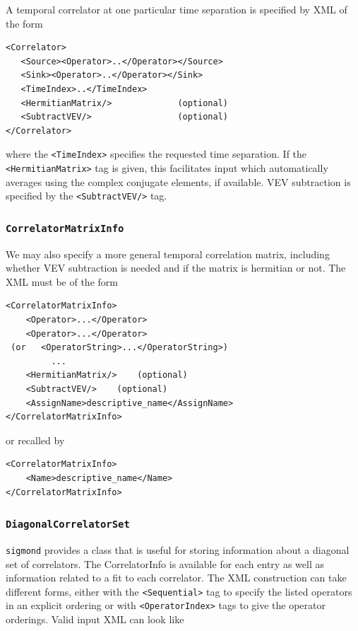 \documentclass[12pt]{article}
\newcommand{\sigmond}{\texttt{sigmond} }
\newcommand{\vb}{\texttt}
\begin{document}
A temporal correlator at one particular time separation is specified
by XML of the form
\begin{verbatim}
<Correlator>
   <Source><Operator>..</Operator></Source>
   <Sink><Operator>..</Operator></Sink>
   <TimeIndex>..</TimeIndex>
   <HermitianMatrix/>             (optional)
   <SubtractVEV/>                 (optional)
</Correlator>
\end{verbatim}
where the \vb{<TimeIndex>} specifies the requested time separation.
If the \vb{<HermitianMatrix>} tag is given, this facilitates
input which automatically averages using the complex conjugate
elements, if available.  VEV subtraction is specified by the
\vb{<SubtractVEV/>} tag.

\subsubsection{\vb{CorrelatorMatrixInfo}}
We may also specify a more general temporal correlation matrix,
including whether VEV subtraction is needed and if the matrix is
hermitian or not. The XML must be of the form
\begin{verbatim}
<CorrelatorMatrixInfo>
    <Operator>...</Operator>
    <Operator>...</Operator>
 (or   <OperatorString>...</OperatorString>)
         ...
    <HermitianMatrix/>    (optional)
    <SubtractVEV/>    (optional)
    <AssignName>descriptive_name</AssignName>
</CorrelatorMatrixInfo>
\end{verbatim}
or recalled by
\begin{verbatim}
<CorrelatorMatrixInfo>
    <Name>descriptive_name</Name>
</CorrelatorMatrixInfo>
\end{verbatim}

\subsubsection{\vb{DiagonalCorrelatorSet}} \label{sec:diag_corr_set}
\sigmond provides a class that is useful for storing information
about a diagonal set of correlators. The CorrelatorInfo is
available for each entry as well as information related to a fit
to each correlator. The XML construction can take different forms,
either with the \vb{<Sequential>} tag to specify the listed
operators in an explicit ordering or with \newline\vb{<OperatorIndex>}
tags to give the operator orderings. Valid input XML can look like
\end{document}
